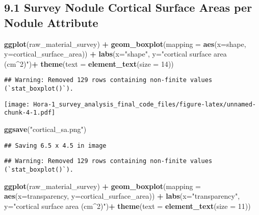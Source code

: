 \documentclass[
]{article}
\newenvironment{Shaded}{\begin{snugshade}}{\end{snugshade}}
\newcommand{\AttributeTok}[1]{\textcolor[rgb]{0.13,0.29,0.53}{#1}}
\newcommand{\DecValTok}[1]{\textcolor[rgb]{0.00,0.00,0.81}{#1}}
\newcommand{\FunctionTok}[1]{\textcolor[rgb]{0.13,0.29,0.53}{\textbf{#1}}}
\newcommand{\NormalTok}[1]{#1}
\newcommand{\SpecialCharTok}[1]{\textcolor[rgb]{0.81,0.36,0.00}{\textbf{#1}}}
\newcommand{\StringTok}[1]{\textcolor[rgb]{0.31,0.60,0.02}{#1}}
\begin{document}
\hypertarget{survey-nodule-cortical-surface-areas-per-nodule-attribute}{%
\subsection{9.1 Survey Nodule Cortical Surface Areas per Nodule
Attribute}\label{survey-nodule-cortical-surface-areas-per-nodule-attribute}}

\begin{Shaded}
\begin{Highlighting}[]
\FunctionTok{ggplot}\NormalTok{(raw\_material\_survey) }\SpecialCharTok{+}
  \FunctionTok{geom\_boxplot}\NormalTok{(}\AttributeTok{mapping =} \FunctionTok{aes}\NormalTok{(}\AttributeTok{x=}\NormalTok{shape, }\AttributeTok{y=}\NormalTok{cortical\_surface\_area)) }\SpecialCharTok{+}
  \FunctionTok{labs}\NormalTok{(}\AttributeTok{x=}\StringTok{"shape"}\NormalTok{, }\AttributeTok{y=}\StringTok{"cortical surface area (cm\^{}2)"}\NormalTok{)}\SpecialCharTok{+}
  \FunctionTok{theme}\NormalTok{(}\AttributeTok{text =} \FunctionTok{element\_text}\NormalTok{(}\AttributeTok{size =} \DecValTok{14}\NormalTok{))}
\end{Highlighting}
\end{Shaded}

\begin{verbatim}
## Warning: Removed 129 rows containing non-finite values (`stat_boxplot()`).
\end{verbatim}

\texttt{[image: Hora-1\_survey\_analysis\_final\_code\_files/figure-latex/unnamed-chunk-4-1.pdf]}

\begin{Shaded}
\begin{Highlighting}[]
\FunctionTok{ggsave}\NormalTok{(}\StringTok{"cortical\_sa.png"}\NormalTok{)}
\end{Highlighting}
\end{Shaded}

\begin{verbatim}
## Saving 6.5 x 4.5 in image
\end{verbatim}

\begin{verbatim}
## Warning: Removed 129 rows containing non-finite values (`stat_boxplot()`).
\end{verbatim}

\begin{Shaded}
\begin{Highlighting}[]
\FunctionTok{ggplot}\NormalTok{(raw\_material\_survey) }\SpecialCharTok{+}
  \FunctionTok{geom\_boxplot}\NormalTok{(}\AttributeTok{mapping =} \FunctionTok{aes}\NormalTok{(}\AttributeTok{x=}\NormalTok{transparency, }\AttributeTok{y=}\NormalTok{cortical\_surface\_area)) }\SpecialCharTok{+}
  \FunctionTok{labs}\NormalTok{(}\AttributeTok{x=}\StringTok{"transparency"}\NormalTok{, }\AttributeTok{y=}\StringTok{"cortical surface area (cm\^{}2)"}\NormalTok{)}\SpecialCharTok{+}
  \FunctionTok{theme}\NormalTok{(}\AttributeTok{text =} \FunctionTok{element\_text}\NormalTok{(}\AttributeTok{size =} \DecValTok{11}\NormalTok{))}
\end{Highlighting}
\end{Shaded}
\end{document}
